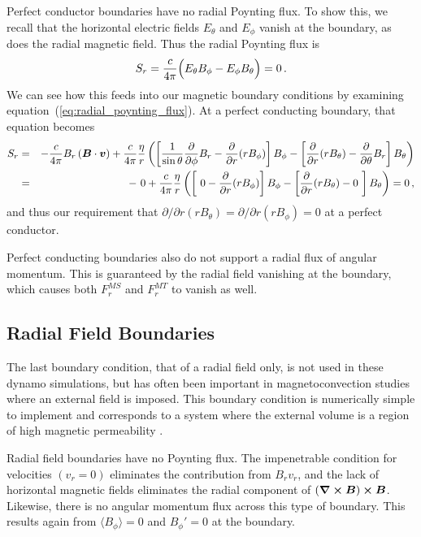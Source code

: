 Perfect conductor boundaries have no radial Poynting flux.  To show
this, we recall that the horizontal electric fields $E_\theta$ and
$E_\phi$ vanish at the boundary, as does the radial magnetic field.
Thus the radial Poynting flux is
\begin{equation}
  S_r = \frac{c}{4 \pi} \Big( E_\theta B_\phi - E_\phi B_\theta \Big) = 0\thinspace.
\end{equation}
We can see how this feeds into our magnetic boundary conditions by
examining equation~(\ref{eq:radial_poynting_flux}).  At a perfect
conducting boundary, that equation becomes
\begin{eqnarray}
 S_r &=&  -  \frac{c}{4 \pi} B_r \left(\vec{B} \cdot \vec{v}\right) +
        \frac{c}{4 \pi} \frac{\eta}{r} \left(
	\left[\frac{1}{\sin \theta} \frac{\partial}{\partial \phi} B_r - 
	      \frac{\partial}{\partial r}(r B_\phi)\right] B_\phi - 
	\left[\frac{\partial}{\partial r}(r B_\theta) - 
	      \frac{\partial}{\partial \theta} B_r \right] B_\theta 
	\right) \nonumber \\
	&=& - ~0 +
        \frac{c}{4 \pi} \frac{\eta}{r} \left(
	\left[ ~0 - \frac{\partial}{\partial r}(r B_\phi)\right] B_\phi - 
	\left[ \frac{\partial}{\partial r}(r B_\theta) - 0~\right] B_\theta 
	\right) = 0\thinspace,
\end{eqnarray}
and thus our requirement that 
$\partial/\partial r(r B_\theta)=\partial/\partial r(r B_\phi)=0$ at a perfect conductor. 

Perfect conducting boundaries also do not support a radial flux
of angular momentum.  This is guaranteed by the radial field vanishing
at the boundary, which causes both $F^{MS}_r$ and $F^{MT}_r$ to vanish
as well.


\clearpage
\subsection{Radial Field Boundaries}
The last boundary condition, that of a radial field only, is not used
in these dynamo simulations, but has often been important in
magnetoconvection studies where an external field is imposed.  This boundary condition is
numerically simple to implement and corresponds to a system where the
external volume is a region of high magnetic permeability
\citep[e.g.,][pg.~194]{Jackson_1999}.

Radial field boundaries have no Poynting flux.  The
impenetrable condition for velocities $(v_r = 0)$ eliminates the
contribution from $B_r v_r$, and the lack of horizontal magnetic
fields eliminates the radial component of $\left(\vec{\nabla} \cross \vec{B} \right)\cross \vec{B}$.
Likewise, there is no angular momentum flux across this type of
boundary.  This results again from $\langle B_\phi \rangle =0$ and
$B_\phi'=0$ at the boundary.


